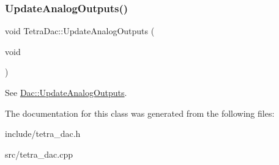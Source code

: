 \subsubsection{\texorpdfstring{Update\+Analog\+Outputs()}{UpdateAnalogOutputs()}}
{\footnotesize\ttfamily void Tetra\+Dac\+::\+Update\+Analog\+Outputs (\begin{DoxyParamCaption}\item[{void}]{ }\end{DoxyParamCaption})}

See \mbox{\hyperlink{classDac_aafef1707ec33a2166a69e9b646cd471b}{Dac\+::\+Update\+Analog\+Outputs}}. 

The documentation for this class was generated from the following files\+:\begin{DoxyCompactItemize}
\item 
include/tetra\+\_\+dac.\+h\item 
src/tetra\+\_\+dac.\+cpp\end{DoxyCompactItemize}
